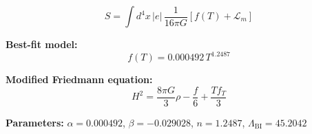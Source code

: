 
\begin{equation}
  S = \int d^4x \, |e| \, \frac{1}{16\pi G} \left[ f(T) + \mathcal{L}_m \right]
\end{equation}

\textbf{Best-fit model:}
\begin{equation}
  f(T) = 0.000492 \, T^{1.2487}
\end{equation}

\textbf{Modified Friedmann equation:}
\begin{equation}
  H^2 = \frac{8\pi G}{3} \rho - \frac{f}{6} + \frac{T f_T}{3}
\end{equation}

\textbf{Parameters:}
$\alpha = 0.000492$, \quad
$\beta = -0.029028$, \quad
$n = 1.2487$, \quad
$\Lambda_{\text{BI}} = 45.2042$